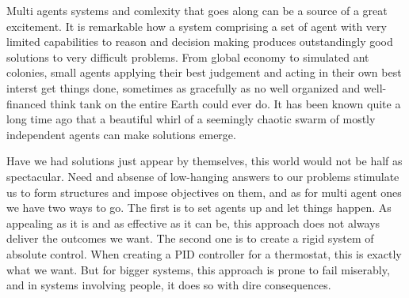 Multi agents systems and comlexity that goes along can be a source of a great excitement. It is remarkable how a system
comprising a set of agent with very limited capabilities to reason and decision making produces outstandingly good
solutions to very difficult problems. From global economy to simulated ant colonies, small agents applying their best
judgement and acting in their own best interst get things done, sometimes as gracefully as no well organized and
well-financed think tank on the entire Earth could ever do. It has been known quite a long time ago that a beautiful
whirl of a seemingly chaotic swarm of mostly independent agents can make solutions emerge.

Have we had solutions just appear by themselves, this world would not be half as spectacular. Need and absense of
low-hanging answers to our problems stimulate us to form structures and impose objectives on them, and as for multi
agent ones we have two ways to go. The first is to set agents up and let things happen. As appealing as it is and as
effective as it can be, this approach does not always deliver the outcomes we want. The second one is to create a rigid
system of absolute control. When creating a PID controller for a thermostat, this is exactly what we want. But for
bigger systems, this approach is prone to fail miserably, and in systems involving people, it does so with dire
consequences.
